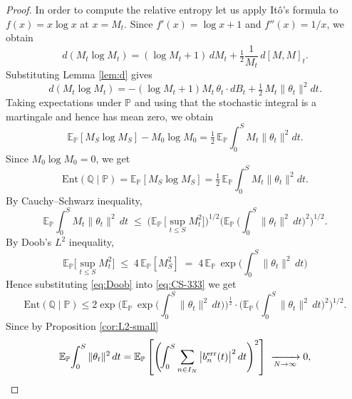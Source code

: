 \documentclass[12pt,reqno]{amsart}
\theoremstyle{plain}
\theoremstyle{definition}
\theoremstyle{remark}
\begin{document}
\begin{proof}
In order to compute the relative entropy let us apply It\^o’s formula to $f(x)=x\log x$ at $x=M_t$. 
Since $f'(x)=\log x+1$ and $f''(x)=1/x$, we obtain
\begin{equation}
d(M_t\log M_t)=(\log M_t+1)\,dM_t+\tfrac12\frac{1}{M_t}\,d[ M,M]_t.
\end{equation}
Substituting Lemma \ref{lem:d} gives
\begin{equation}
d(M_t\log M_t)=-(\log M_t+1)M_t\,\theta_t\cdot dB_t
+\tfrac12\,M_t\|\theta_t\|^2dt.
\end{equation}
Taking expectations under $\mathbb P$ and using that the stochastic integral is a martingale and hence has mean zero, we obtain
\begin{equation}
\mathbb E_{\mathbb P}[M_S \log M_S]-M_0\log M_0
=\tfrac12\,\mathbb E_{\mathbb P}\!\int_0^S M_t\|\theta_t\|^2dt.
\end{equation}
Since $M_0\log M_0=0$, we get
\begin{equation}
\mathrm{Ent}(\mathbb Q \!\mid\! \mathbb P)=\mathbb E_{\mathbb P}[M_S\log M_S]
=\tfrac12\,\mathbb E_{\mathbb P}\!\int_0^S M_t\|\theta_t\|^2dt.
\end{equation}
By Cauchy--Schwarz inequality,
\begin{equation}
\label{eq:CS-333}
\mathbb E_{\mathbb P}\!\int_0^S M_t \|\theta_t\|^2\,dt
\;\le\;
\Big(\mathbb E_{\mathbb P} \,\!\big[\sup_{t\le S} M_t^2\big]\Big)^{1/2}
\Big(\mathbb E_{\mathbb P} \,\!\Big(\int_0^S \|\theta_t\|^2\,dt\Big)^2 \Big)^{1/2}.
\end{equation}
By Doob’s $L^2$ inequality,
\begin{equation}
\label{eq:Doob}
\mathbb E_{\mathbb P}\!\Big[\sup_{t\le S} M_t^2\Big]
\;\le\; 4\,\mathbb E_{\mathbb P}[M_S^2]
\;=\; 4\,\mathbb E_{\mathbb P} \, \!\exp\!\Big(\int_0^S \|\theta_t\|^2\,dt\Big)
\end{equation}
Hence substituting \eqref{eq:Doob} into \eqref{eq:CS-333} we get 
\begin{equation}
\label{eq:336}
\mathrm{Ent}(\mathbb Q \!\mid\! \mathbb P) \leq 2\exp\!\Big(  \mathbb E_{\mathbb P} \, \!\exp\!\Big(\int_0^S \|\theta_t\|^2\,dt\Big) \Big)^{\frac{1}{2}} \cdot \Big(\mathbb E_{\mathbb P} \,\!\Big(\int_0^S \|\theta_t\|^2\,dt\Big)^2 \Big)^{1/2}.
\end{equation}
Since by Proposition \ref{cor:L2-small} 
\begin{equation} 
\mathbb E_{\mathbb P}\!\int_0^S \|\theta_t\|^2\,dt
=\mathbb E_{\mathbb P} \left [ \left ( \!\int_0^S\sum_{n\in I_N}\big|b^{\mathrm{err}}_{n}(t)\big|^2\,dt \right )^2 \right ] \;\xrightarrow[N\to\infty]{\ \\ \ } 0 ,

\end{equation}
\end{proof}
\end{document}
